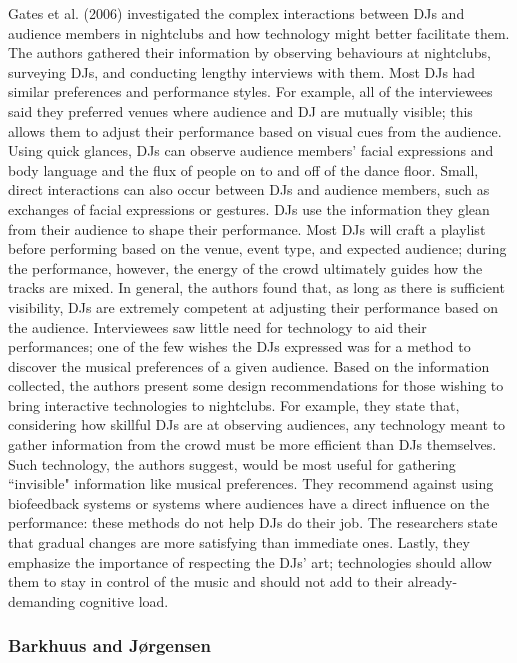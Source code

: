 Gates et al. (2006) investigated the complex interactions between DJs and audience members in nightclubs and how technology might better facilitate them. The authors gathered their information by observing behaviours at nightclubs, surveying DJs, and conducting lengthy interviews with them. Most DJs had similar preferences and performance styles. For example, all of the interviewees said they preferred venues where audience and DJ are mutually visible; this allows them to adjust their performance based on visual cues from the audience. Using quick glances, DJs can observe audience members' facial expressions and body language and the flux of people on to and off of the dance floor. Small, direct interactions can also occur between DJs and audience members, such as exchanges of facial expressions or gestures. DJs use the information they glean from their audience to shape their performance. Most DJs will craft a playlist before performing based on the venue, event type, and expected audience; during the performance, however, the energy of the crowd ultimately guides how the tracks are mixed. In general, the authors found that, as long as there is sufficient visibility, DJs are extremely competent at adjusting their performance based on the audience. Interviewees saw little need for technology to aid their performances; one of the few wishes the DJs expressed was for a method to discover the musical preferences of a given audience. Based on the information collected, the authors present some design recommendations for those wishing to bring interactive technologies to nightclubs. For example, they state that, considering how skillful DJs are at observing audiences, any technology meant to gather information from the crowd must be more efficient than DJs themselves. Such technology, the authors suggest, would be most useful for gathering ``invisible" information like musical preferences. They recommend against using biofeedback systems or systems where audiences have a direct influence on the performance: these methods do not help DJs do their job. The researchers state that gradual changes are more satisfying than immediate ones. Lastly, they emphasize the importance of respecting the DJs' art; technologies should allow them to stay in control of the music and should not add to their already-demanding cognitive load.

\subsubsection{Barkhuus and J{\o}rgensen}

